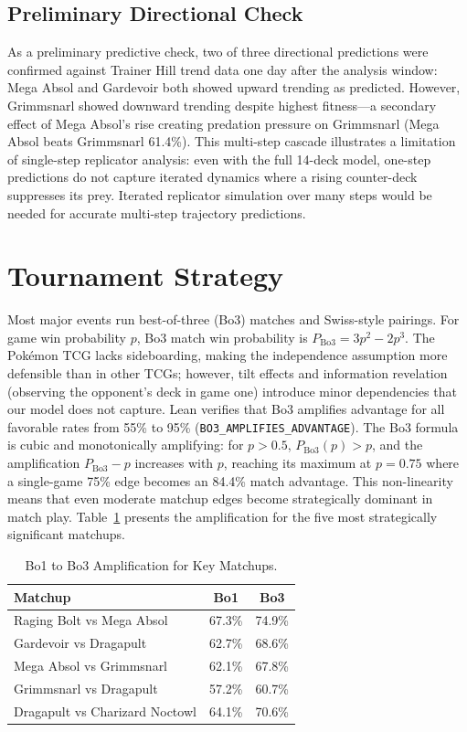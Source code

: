 \documentclass[journal]{IEEEtran}
\let\origsection\section
\renewcommand{\section}{\needspace{4\baselineskip}\origsection}
\let\origsubsection\subsection
\renewcommand{\subsection}{\needspace{3\baselineskip}\origsubsection}
\begin{document}
\subsection{Preliminary Directional Check}

As a preliminary predictive check, two of three directional predictions were confirmed against Trainer Hill trend data one day after the analysis window: Mega Absol and Gardevoir both showed upward trending as predicted.
However, Grimmsnarl showed downward trending despite highest fitness---a secondary effect of Mega Absol's rise creating predation pressure on Grimmsnarl (Mega Absol beats Grimmsnarl 61.4\%).
This multi-step cascade illustrates a limitation of single-step replicator analysis: even with the full 14-deck model, one-step predictions do not capture iterated dynamics where a rising counter-deck suppresses its prey.
Iterated replicator simulation over many steps would be needed for accurate multi-step trajectory predictions.

\section{Tournament Strategy}\label{sec:tournament}

Most major events run best-of-three (Bo3) matches and Swiss-style pairings.
For game win probability $p$, Bo3 match win probability is $P_{\mathrm{Bo3}} = 3p^2 - 2p^3$.
The Pok\'emon TCG lacks sideboarding, making the independence assumption more defensible than in other TCGs; however, tilt effects and information revelation (observing the opponent's deck in game one) introduce minor dependencies that our model does not capture.
Lean verifies that Bo3 amplifies advantage for all favorable rates from 55\% to 95\% (\texttt{BO3\_AMPLIFIES\_ADVANTAGE}).
The Bo3 formula is cubic and monotonically amplifying:
for $p > 0.5$, $P_{\mathrm{Bo3}}(p) > p$, and the amplification $P_{\mathrm{Bo3}} - p$ increases with $p$, reaching its maximum at $p = 0.75$ where a single-game 75\% edge becomes an 84.4\% match advantage.
This non-linearity means that even moderate matchup edges become strategically dominant in match play.
Table~\ref{tab:bo3} presents the amplification for the five most strategically significant matchups.

\begin{table}[!t]
\centering
\caption{Bo1 to Bo3 Amplification for Key Matchups.}
\label{tab:bo3}
\begin{tabular}{lcc}
\toprule
\textbf{Matchup} & \textbf{Bo1} & \textbf{Bo3} \\
\midrule
Raging Bolt vs Mega Absol & 67.3\% & 74.9\% \\
Gardevoir vs Dragapult & 62.7\% & 68.6\% \\
Mega Absol vs Grimmsnarl & 62.1\% & 67.8\% \\
Grimmsnarl vs Dragapult & 57.2\% & 60.7\% \\
Dragapult vs Charizard Noctowl & 64.1\% & 70.6\% \\
\bottomrule
\end{tabular}
\end{table}
\end{document}
